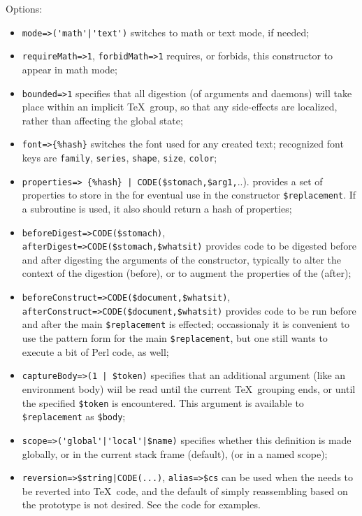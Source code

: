\documentclass{book}
\newcommand{\ltxcode}{\lstinline[style=inlinelatexml]}
\begin{document}
Options:
\begin{itemize}
\item \ltxcode.mode=>('math'|'text'). switches to math or text mode, if needed;
\item \ltxcode|requireMath=>1|, \ltxcode|forbidMath=>1| requires, or forbids,
  this constructor to appear in math mode;
\item \ltxcode|bounded=>1| specifies that all digestion (of arguments and daemons)
  will take place within an implicit \TeX\ group, so that any side-effects
  are localized, rather than affecting the global state;
\item \ltxcode|font=>{%
  switches the font used for any created text;
  recognized font keys are \texttt{family}, \texttt{series}, \texttt{shape}, \texttt{size},
  \texttt{color};
\item \ltxcode.properties=> {%
  provides a set of properties to store in the  for eventual use
  in the constructor \ltxcode|$replacement|.  If a subroutine is used,
  it also should return a hash of properties;
\item \ltxcode|beforeDigest=>CODE($stomach)|,\\
      \ltxcode|afterDigest=>CODE($stomach,$whatsit)|
  provides code to be digested before and after digesting the arguments of
  the constructor, typically to alter the context of the digestion (before),
  or to augment the properties of the  (after);
\item  \ltxcode|beforeConstruct=>CODE($document,$whatsit)|,\\
      \ltxcode|afterConstruct=>CODE($document,$whatsit)|
  provides code to be run before and after the main \ltxcode|$replacement|
  is effected; occassionaly it is convenient to use the pattern
  form for the main \ltxcode|$replacement|, but one still wants to execute
  a bit of Perl code, as well;
\item \ltxcode.captureBody=>(1 | $token).
  specifies that an additional argument (like an environment body) wiil
  be read until the current \TeX\ grouping ends, or until the specified \ltxcode|$token|
  is encountered. This argument is available to \ltxcode|$replacement| as \ltxcode|$body|;
\item \ltxcode.scope=>('global'|'local'|$name). specifies whether this
  definition is made globally, or in the current stack frame (default),
  (or in a named scope);
\item \ltxcode&reversion=>$string|CODE(...)&,
   \ltxcode|alias=>$cs|
  can be used when the  needs to be reverted into \TeX\ code,
  and the default of simply reassembling based on the prototype is not desired.
  See the code for examples.
\end{itemize}
\end{document}
